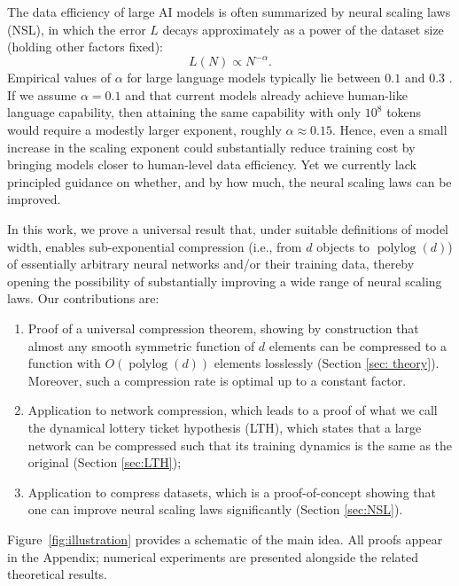 \documentclass{article}
\theoremstyle{plain}
\begin{document}
The data efficiency of large AI models is often summarized by neural scaling laws (NSL), in which the error $L$ decays approximately as a power of the dataset size (holding other factors fixed):
\begin{equation}
    L(N) \propto N^{-\alpha}.
\end{equation}
Empirical values of $\alpha$ for large language models typically lie between $0.1$ and $0.3$ \citep{kaplan2020scaling}. If we assume $\alpha=0.1$ and that current models already achieve human-like language capability, then attaining the same capability with only $10^8$ tokens would require a modestly larger exponent, roughly $\alpha \approx 0.15$. Hence, even a small increase in the scaling exponent could substantially reduce training cost by bringing models closer to human-level data efficiency. Yet we currently lack principled guidance on whether, and by how much, the neural scaling laws can be improved.

In this work, we prove a universal result that, under suitable definitions of model width, enables sub-exponential compression (i.e., from $d$ objects to $\operatorname{polylog}(d)$) of essentially arbitrary neural networks and/or their training data, thereby opening the possibility of substantially improving a wide range of neural scaling laws. Our contributions are:
\begin{enumerate}[noitemsep,topsep=0pt,parsep=0pt,partopsep=0pt,leftmargin=16pt]
    \item Proof of a universal compression theorem, showing by construction that almost any smooth symmetric function of $d$ elements can be compressed to a function with $O(\operatorname{polylog}(d))$ elements losslessly (Section \ref{sec: theory}). Moreover, such a compression rate is optimal up to a constant factor.
    \item Application to network compression, which leads to a proof of what we call the dynamical lottery ticket hypothesis (LTH), which states that a large network can be compressed such that its training dynamics is the same as the original (Section \ref{sec:LTH});
    \item Application to compress datasets, which is a proof-of-concept showing that one can improve neural scaling laws significantly (Section \ref{sec:NSL}).
\end{enumerate}
Figure~\ref{fig:illustration} provides a schematic of the main idea. All proofs appear in the Appendix; numerical experiments are presented alongside the related theoretical results.
\end{document}

